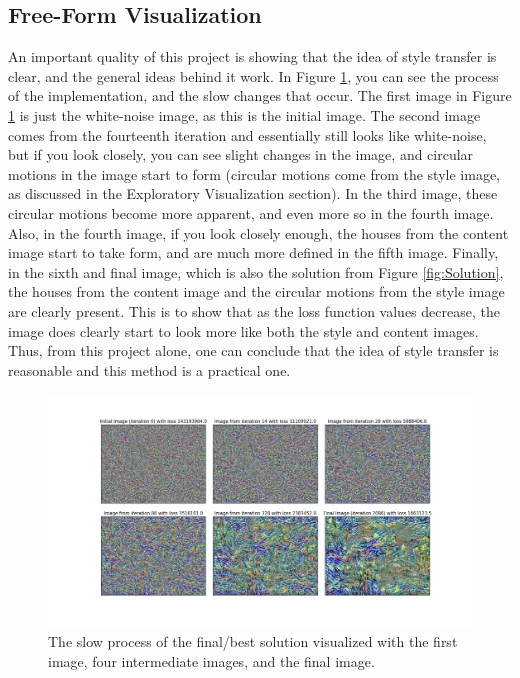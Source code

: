 \documentclass[12pt]{article}
\begin{document}
\subsection{Free-Form Visualization}
An important quality of this project is showing that the idea of style transfer is clear, and the general ideas behind it work. In Figure \ref{fig:Visual}, you can see the process of the implementation, and the slow changes that occur. The first image in Figure \ref{fig:Visual} is just the white-noise image, as this is the initial image. The second image comes from the fourteenth iteration and essentially still looks like white-noise, but if you look closely, you can see slight changes in the image, and circular motions in the image start to form (circular motions come from the style image, as discussed in the Exploratory Visualization section). In the third image, these circular motions become more apparent, and even more so in the fourth image. Also, in the fourth image, if you look closely enough, the houses from the content image start to take form, and are much more defined in the fifth image. Finally, in the sixth and final image, which is also the solution from Figure \ref{fig:Solution}, the houses from the content image and the circular motions from the style image are clearly present. This is to show that as the loss function values decrease, the image does clearly start to look more like both the style and content images. Thus, from this project alone, one can conclude that the idea of style transfer is reasonable and this method is a practical one.
\begin{figure}
  \includegraphics[width=150mm]{visualization.jpg}
  \caption{The slow process of the final/best solution visualized with the first image, four intermediate images, and the final image.}
  \label{fig:Visual}
\end{figure}
\end{document}
